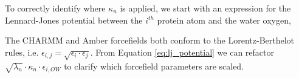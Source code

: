 To correctly identify where $\kappa_n$ is applied, we start with an expression for the Lennard-Jones potential between the $i^{th}$ protein atom and the water oxygen,


The CHARMM and Amber forcefields both conform to the Lorentz-Berthelot rules, i.e. $\epsilon_{i,j}=\sqrt{\epsilon_i\cdot \epsilon_j}$. From Equation \ref{eq:lj_potential} we can refactor $\sqrt{\lambda_n}\cdot\kappa_n\cdot\epsilon_{i,OW}$ to clarify which forcefield parameters are scaled. 


%



